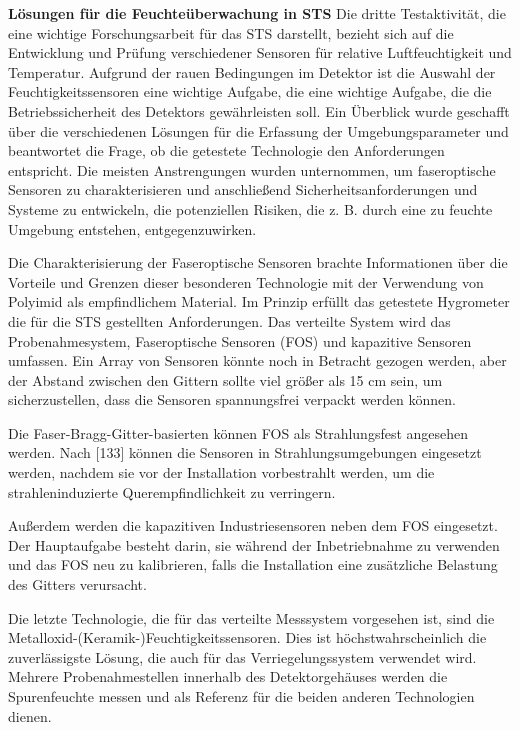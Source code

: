 \bigbreak
\textbf{Lösungen für die Feuchteüberwachung in \gls{STS}}
\bigbreak
Die dritte Testaktivität, die eine wichtige Forschungsarbeit für das \gls{STS} darstellt, bezieht sich auf die Entwicklung und Prüfung verschiedener Sensoren für relative Luftfeuchtigkeit und Temperatur. Aufgrund der rauen Bedingungen im Detektor ist die Auswahl der Feuchtigkeitssensoren eine wichtige Aufgabe, die eine wichtige Aufgabe, die die Betriebssicherheit des Detektors gewährleisten soll. Ein Überblick wurde geschafft über die verschiedenen Lösungen für die Erfassung der Umgebungsparameter und beantwortet die Frage, ob die getestete Technologie den Anforderungen entspricht. Die meisten Anstrengungen wurden unternommen, um faseroptische Sensoren zu charakterisieren und anschließend Sicherheitsanforderungen und Systeme zu entwickeln, die potenziellen Risiken, die z. B. durch eine zu feuchte Umgebung entstehen, entgegenzuwirken.

Die Charakterisierung der Faseroptische Sensoren brachte Informationen über die Vorteile und Grenzen dieser besonderen Technologie mit der Verwendung von Polyimid als empfindlichem Material. Im Prinzip erfüllt das getestete Hygrometer die für die \gls{STS} gestellten Anforderungen. Das verteilte System wird das Probenahmesystem, Faseroptische Sensoren (\gls{FOS}) und kapazitive Sensoren umfassen. Ein Array von Sensoren könnte noch in Betracht gezogen werden, aber der Abstand zwischen den Gittern sollte viel größer als 15 cm sein, um sicherzustellen, dass die Sensoren spannungsfrei verpackt werden können. 

Die Faser-Bragg-Gitter-basierten können \gls{FOS} als Strahlungsfest angesehen werden. Nach [133] können die Sensoren in Strahlungsumgebungen eingesetzt werden, nachdem sie vor der Installation vorbestrahlt werden, um die strahleninduzierte Querempfindlichkeit zu verringern.

Außerdem werden die kapazitiven Industriesensoren neben dem \gls{FOS} eingesetzt. Der Hauptaufgabe besteht darin, sie während der Inbetriebnahme zu verwenden und das \gls{FOS} neu zu kalibrieren, falls die Installation eine zusätzliche Belastung des Gitters verursacht.

Die letzte Technologie, die für das verteilte Messsystem vorgesehen ist, sind die Metalloxid-(Keramik-)Feuchtigkeitssensoren. Dies ist höchstwahrscheinlich die zuverlässigste Lösung, die auch für das Verriegelungssystem verwendet wird. Mehrere Probenahmestellen innerhalb des Detektorgehäuses werden die Spurenfeuchte messen und als Referenz für die beiden anderen Technologien dienen.

